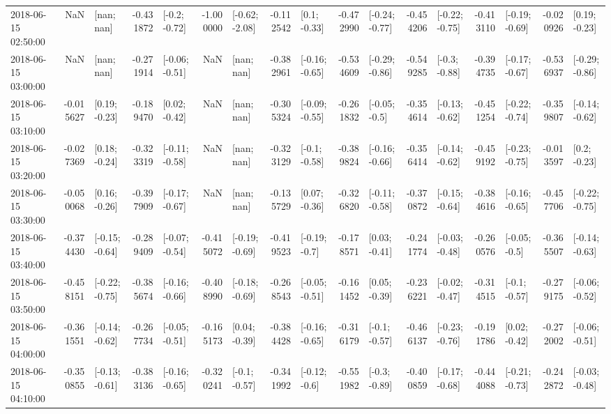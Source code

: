 \begin{tabular}{lrlrlrlrlrlrlrlrl}
2018-06-15 02:50:00 &       NaN &      [nan; nan] & -0.431872 &   [-0.2; -0.72] & -1.000000 &  [-0.62; -2.08] & -0.112542 &    [0.1; -0.33] & -0.472990 &  [-0.24; -0.77] & -0.454206 &  [-0.22; -0.75] & -0.413110 &  [-0.19; -0.69] & -0.020926 &   [0.19; -0.23] \\
2018-06-15 03:00:00 &       NaN &      [nan; nan] & -0.271914 &  [-0.06; -0.51] &       NaN &      [nan; nan] & -0.382961 &  [-0.16; -0.65] & -0.534609 &  [-0.29; -0.86] & -0.549285 &   [-0.3; -0.88] & -0.394735 &  [-0.17; -0.67] & -0.536937 &  [-0.29; -0.86] \\
2018-06-15 03:10:00 & -0.015627 &   [0.19; -0.23] & -0.189470 &   [0.02; -0.42] &       NaN &      [nan; nan] & -0.305324 &  [-0.09; -0.55] & -0.261832 &   [-0.05; -0.5] & -0.354614 &  [-0.13; -0.62] & -0.451254 &  [-0.22; -0.74] & -0.359807 &  [-0.14; -0.62] \\
2018-06-15 03:20:00 & -0.027369 &   [0.18; -0.24] & -0.323319 &  [-0.11; -0.58] &       NaN &      [nan; nan] & -0.323129 &   [-0.1; -0.58] & -0.389824 &  [-0.16; -0.66] & -0.356414 &  [-0.14; -0.62] & -0.459192 &  [-0.23; -0.75] & -0.013597 &    [0.2; -0.23] \\
2018-06-15 03:30:00 & -0.050068 &   [0.16; -0.26] & -0.397909 &  [-0.17; -0.67] &       NaN &      [nan; nan] & -0.135729 &   [0.07; -0.36] & -0.326820 &  [-0.11; -0.58] & -0.370872 &  [-0.15; -0.64] & -0.384616 &  [-0.16; -0.65] & -0.457706 &  [-0.22; -0.75] \\
2018-06-15 03:40:00 & -0.374430 &  [-0.15; -0.64] & -0.289409 &  [-0.07; -0.54] & -0.415072 &  [-0.19; -0.69] & -0.419523 &   [-0.19; -0.7] & -0.178571 &   [0.03; -0.41] & -0.241774 &  [-0.03; -0.48] & -0.260576 &   [-0.05; -0.5] & -0.365507 &  [-0.14; -0.63] \\
2018-06-15 03:50:00 & -0.458151 &  [-0.22; -0.75] & -0.385674 &  [-0.16; -0.66] & -0.408990 &  [-0.18; -0.69] & -0.268543 &  [-0.05; -0.51] & -0.161452 &   [0.05; -0.39] & -0.236221 &  [-0.02; -0.47] & -0.314515 &   [-0.1; -0.57] & -0.279175 &  [-0.06; -0.52] \\
2018-06-15 04:00:00 & -0.361551 &  [-0.14; -0.62] & -0.267734 &  [-0.05; -0.51] & -0.165173 &   [0.04; -0.39] & -0.384428 &  [-0.16; -0.65] & -0.316179 &   [-0.1; -0.57] & -0.466137 &  [-0.23; -0.76] & -0.191786 &   [0.02; -0.42] & -0.272002 &  [-0.06; -0.51] \\
2018-06-15 04:10:00 & -0.350855 &  [-0.13; -0.61] & -0.383136 &  [-0.16; -0.65] & -0.320241 &   [-0.1; -0.57] & -0.341992 &   [-0.12; -0.6] & -0.551982 &   [-0.3; -0.89] & -0.400859 &  [-0.17; -0.68] & -0.444088 &  [-0.21; -0.73] & -0.242872 &  [-0.03; -0.48] \\

\end{tabular}

